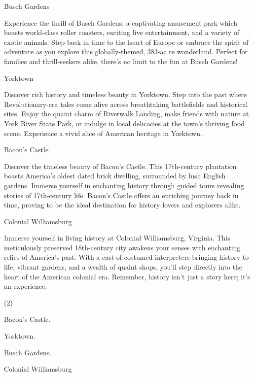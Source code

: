 \documentclass{英语试卷}
\begin{document}
\par Busch Gardens\par
\par Experience the thrill of Busch Gardens, a captivating amusement park which boasts world-class roller coasters, exciting live entertainment, and a variety of exotic animals. Step back in time to the heart of Europe or embrace the spirit of adventure as you explore this globally-themed, 383-ac re wonderland. Perfect for families and thrill-seekers alike, there's no limit to the fun at Busch Gardens!\par
\par Yorktown\par
\par Discover rich history and timeless beauty in Yorktown. Step into the past where Revolutionary-era tales come alive across breathtaking battlefields and historical sites. Enjoy the quaint charm of Riverwalk Landing, make friends with nature at York River State Park, or indulge in local delicacies at the town's thriving food scene. Experience a vivid slice of American heritage in Yorktown.\par
\par Bacon's Castle\par
\par Discover the timeless beauty of Bacon's Castle. This 17th-century plantation boasts America's oldest dated brick dwelling, surrounded by lush English gardens. Immerse yourself in enchanting history through guided tours revealing stories of 17th-century life. Bacon's Castle offers an enriching journey back in time, proving to be the ideal destination for history lovers and explorers alike.\par
\par Colonial Williamsburg\par
\par Immerse yourself in living history at Colonial Williamsburg, Virginia. This meticulously preserved 18th-century city awakens your senses with enchanting relics of America's past. With a cast of costumed interpreters bringing history to life, vibrant gardens, and a wealth of quaint shops, you'll step directly into the heart of the American colonial era. Remember, history isn't just a story here; it's an experience.\par
{}
\begin{choices}(2)
  \item Bacon's Castle.
  \item Yorktown.
  \item Busch Gardens.
  \item Colonial Williamsburg
\end{choices}
\end{document}
